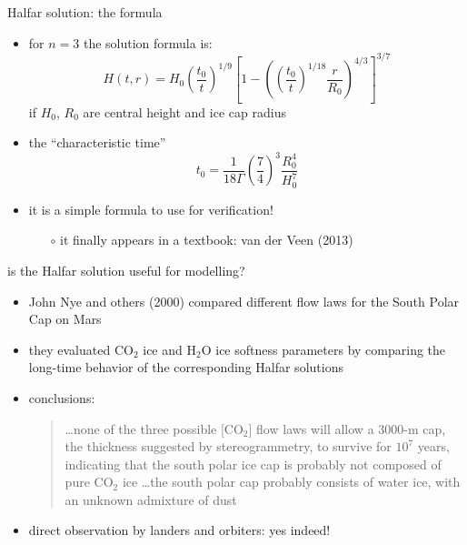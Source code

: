 \begin{frame}{Halfar solution: the formula}

\begin{itemize}
\item for $n=3$ the solution formula is:
  $$H(t,r) = H_0 \left(\frac{t_0}{t}\right)^{1/9} \left[1 - \left(\left(\frac{t_0}{t}\right)^{1/18} \frac{r}{R_0}\right)^{4/3}\right]^{3/7}$$
if $H_0$, $R_0$ are central height and ice cap radius
\item the ``characteristic time''
  $$t_0 = \frac{1}{18 \Gamma} \left(\frac{7}{4}\right)^3 \frac{R_0^4}{H_0^{7}}$$
\item it is a simple formula to use for verification!
    \begin{itemize}
    \item[$\circ$] it finally appears in a textbook: van der Veen (2013)
    \end{itemize}
\end{itemize}
\end{frame}


\begin{frame}{is the Halfar solution useful for modelling?}

\begin{itemize}
\item John Nye and others (2000) compared different flow laws for the South Polar Cap on Mars
\item they evaluated $\text{CO}_2$ ice and $\text{H}_2\text{O}$ ice softness parameters by comparing the long-time behavior of the corresponding Halfar solutions
\item conclusions:
  \begin{quote}
  \dots none of the three possible [$\text{CO}_2$] flow laws will allow a 3000-m cap, the thickness suggested by stereogrammetry, to survive for $10^7$ years, indicating that the south polar ice cap is probably not composed of pure $\text{CO}_2$ ice \dots the south polar cap probably consists of water ice, with an unknown admixture of dust
  \end{quote}
\item direct observation by landers and orbiters: yes indeed!
\end{itemize}

\end{frame}


